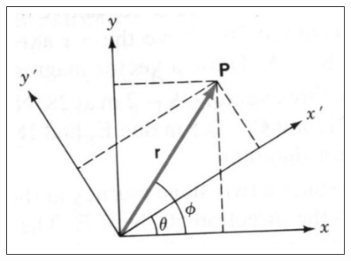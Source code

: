 \documentclass{article}
\begin{document}
\begin{figure}[ht]
    \centering
    \includegraphics[scale=0.5]{graph-3.png}
\end{figure}
\end{document}
